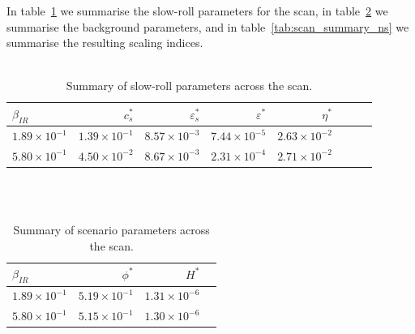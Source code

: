     In table~\ref{tab:scan_summary_sr} we summarise the slow-roll parameters for the scan,
    in table~\ref{tab:scan_summary_bkgd} we summarise the background parameters,
    and in table~\ref{tab:scan_summary_ns} we summarise the resulting scaling indices.
    \\
    \\
\begin{table}[h!]
  \begin{center}
    \begin{tabular}{lrrrrrrr}
        \toprule
        $\beta_{IR}$ &    $c_s^{*}$ &  $\varepsilon_s^{*}$ &   $\varepsilon^{*}$ &   $\eta^{*}$ \\
        \midrule
        $1.89\times 10^{-1}$  &  $1.39\times 10^{-1}$  &  $  8.57\times 10^{-3}$  &  $7.44\times 10^{-5}$  &  $2.63\times 10^{-2}$ \\
        $5.80\times 10^{-1}$  &  $4.50\times 10^{-2}$  &  $  8.67\times 10^{-3}$  &  $2.31\times 10^{-4}$  &  $2.71\times 10^{-2}$ \\
        \bottomrule
    \end{tabular}
    \caption{Summary of slow-roll parameters across the scan.}\label{tab:scan_summary_sr}
  \end{center}
\end{table}
    \\
    \\
\begin{table}[h!]
  \begin{center}
    \begin{tabular}{lrrr}
        \toprule
        $\beta_{IR}$ &  $\phi^{*}$ &     $H^{*}$ \\
        \midrule
        $1.89\times 10^{-1}$  &  $5.19\times 10^{-1}$  &  $1.31\times 10^{-6}$\\
        $5.80\times 10^{-1}$  &  $5.15\times 10^{-1}$  &  $1.30\times 10^{-6}$\\
        \bottomrule
    \end{tabular}
    \caption{Summary of scenario parameters across the scan.}\label{tab:scan_summary_bkgd}
  \end{center}
\end{table}
